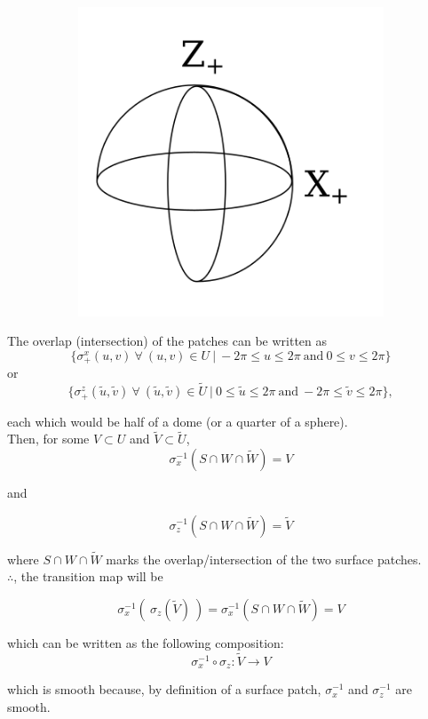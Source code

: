\documentclass[12pt]{article}
\begin{document}
\begin{figure}[h!]
  \centering
      \begin{subfigure}[b]{0.3\linewidth}
    \includegraphics[width=\linewidth]{./assets/4-2-2/s2-patches-intersection.png}
  \end{subfigure}
  \end{figure}
	\indent

The overlap (intersection) of the patches can be written as
$$
\lbrace \sigma^{x}_{+}(u,v)  \ \forall \ (u, v) \in U  \ | \ -2\pi \leq u \leq 2\pi  \ \textrm{and} \ 0 \leq v \leq 2\pi  \rbrace
$$
\indent
or
$$
\lbrace \sigma^{z}_{+}(\tilde u, \tilde v)  \ \forall \ (\tilde u, \tilde v) \in \widetilde{U}  \ | \  0 \leq \tilde u \leq 2\pi  \ \textrm{and} \ -2\pi \leq \tilde v \leq 2\pi \rbrace,
$$

each which would be half of a dome (or a quarter of a sphere).\\

\indent
Then, for some $V \subset U$ and $\widetilde V \subset \widetilde U$,
$$
\sigma^{-1}_{x}(S \cap W \cap \widetilde W) = V
$$

\indent
and

$$
\sigma^{-1}_{z}(S \cap W \cap \widetilde W) = \tilde V
$$

where $S \cap W \cap \widetilde W $ marks the overlap/intersection of the two surface patches.\\
\indent
$\therefore$, the transition map will be

$$
\sigma^{-1}_{x}( \ \sigma_{z}(\widetilde V)  \ ) = \sigma^{-1}_{x}(S \cap W \cap \widetilde W) = V
$$

which can be written as the following composition:
$$
\sigma^{-1}_{x} \circ \sigma_{z} : \widetilde V \rightarrow V
$$

which is smooth because, by definition of a surface patch, $\sigma^{-1}_{x}$ and $\sigma^{-1}_{z}$ are smooth.
\end{document}
